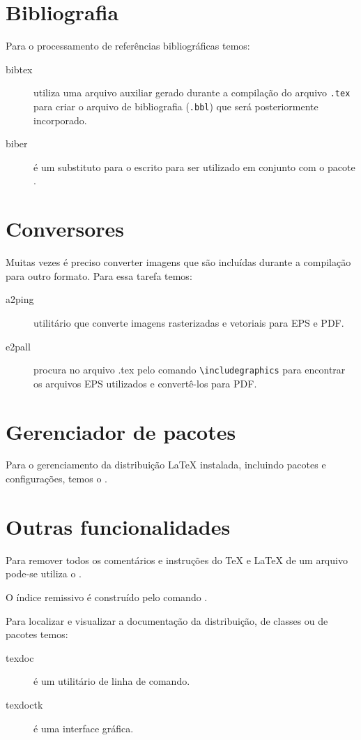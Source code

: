 \section{Bibliografia}
Para o processamento de referências bibliográficas temos:
\begin{description}
  \item[bibtex] utiliza uma arquivo auxiliar gerado durante a compilação do
    arquivo \lstinline+.tex+ para criar o arquivo de bibliografia
    (\lstinline+.bbl+) que será posteriormente incorporado.
  \item[biber] é um substituto para o  escrito para ser
    utilizado em conjunto com o pacote .
\end{description}

\section{Conversores}
Muitas vezes é preciso converter imagens que são incluídas durante a compilação
para outro formato. Para essa tarefa temos:
\begin{description}
  \item[a2ping] utilitário que converte imagens rasterizadas e vetoriais para
    EPS e PDF.
  \item[e2pall] procura no arquivo .tex pelo comando
    \lstinline+\includegraphics+ para encontrar os arquivos EPS utilizados e
    convertê-los para PDF.
\end{description}

\section{Gerenciador de pacotes}
Para o gerenciamento da distribuição LaTeX instalada, incluindo pacotes e
configurações, temos o .

\section{Outras funcionalidades}
Para remover todos os comentários e instruções do TeX e LaTeX de um arquivo
pode-se utiliza o .

O índice remissivo é construído pelo comando .

Para localizar e visualizar a documentação da distribuição, de classes ou de
pacotes temos:
\begin{description}
  \item[texdoc] é um utilitário de linha de comando.
  \item[texdoctk] é uma interface gráfica.
\end{description}

